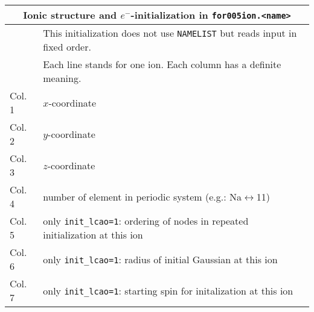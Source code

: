 \documentclass[12pt]{article}
\begin{document}
\begin{tabular}{ll}
\hline
\multicolumn{2}{c}{Ionic structure and $e^-$-initialization in {\tt for005ion.<name>}} \\
\hline
& This initialization does not use {\tt NAMELIST} but reads
 input in fixed order.\\
& Each line stands for one ion. Each column has a definite meaning.\\
Col. 1 &  $x$-coordinate \\
Col. 2 &  $y$-coordinate \\
Col. 3 &  $z$-coordinate \\
Col. 4 & 
   number of element in periodic system (e.g.: Na$\leftrightarrow$11)\\
Col. 5 & only {\tt init\_lcao=1}: ordering of nodes in repeated
    initialization at this ion\\
Col. 6 & only {\tt init\_lcao=1}: radius of initial Gaussian at 
    this ion\\
Col. 7 & only {\tt init\_lcao=1}: starting spin for initalization at
    this ion\\
\hline
\end{tabular}
\\[8pt]
\end{document}
